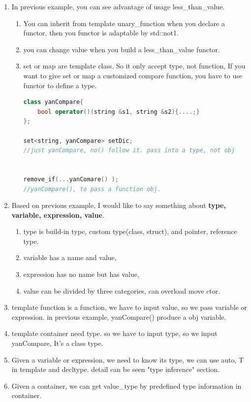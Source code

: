 \documentclass[a4paper,12pt,twoside]{book}
\begin{document}
\begin{enumerate}
   \item In previous example, you can see advantage of usage less\_than\_value.
   \begin{enumerate}
   \item You can inherit from  template unary\_function when you declare a functor, then you functor is adaptable by std::not1.

   \item you can change value when you build a less\_than\_value functor.

   \item set or map are template class. So it only accept type, not function, If you want to give set or map a customized compare function,  you have to use functor to define a type.
\begin{lstlisting}[frame=single, language=c++]
class yanCompare{
    bool operator()(string &s1, string &s2){....;}
};

set<string, yanCompare> setDic;
//just yanCompare, no() follow it. pass into a type, not obj


remove_if(...yanComare() );
//yanCompare(), to pass a function obj.
 \end{lstlisting}
\end{enumerate}

\item Based on previous example, I would like to say something about \textbf{type, variable, expression, value}.
\begin{enumerate}
\item type is build-in type, custom type(class, struct), and pointer, reference type.
\item variable has a name and value,
\item expression has no name but has value,
\item value can be divided by three categories, can overload move ctor.
\end{enumerate}
\item template function is a function, we have to input value, so we pass variable or expression. in previous example, yanCompare() produce a obj variable.
\item template container need type. so we have to input type, so we input yanCompare, It's a class type.
\item Given a variable or expression, we need to know its type, we can use auto, T in template and decltype. detail can be seen "type inference" section.
\item Given a container, we can get value\_type by predefined type information in container.


\end{enumerate}
\end{document}
